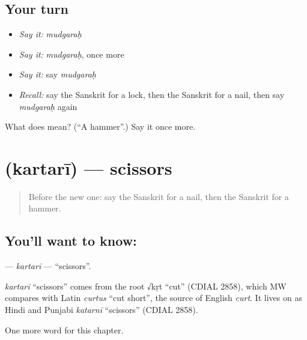 \subsection*{Your turn}
\begin{itemize}
\raggedright
  \item \emph{Say it:} \emph{mudgaraḥ}
  \item \emph{Say it:} \emph{mudgaraḥ}, once more
  \item \emph{Say it:} say \emph{mudgaraḥ}
  \item \emph{Recall:} say the Sanskrit for a lock, then the Sanskrit for a nail, then say \emph{mudgaraḥ} again
\end{itemize}

\begin{tcolorbox}[breakable,colback=teal!4,colframe=teal!35!black,title={Before you move on}]
What does  mean? (\textquotedblleft{}A hammer\textquotedblright{}.) Say it once more.
\end{tcolorbox}
\section[\texorpdfstring{\sk{कर्तरी} (kartarī)}{कर्तरी (kartarī)}]{ (kartarī) — scissors}

\label{lesson:SA-C100-kartari}



\begin{quote}
Before the new one: say the Sanskrit for a nail, then the Sanskrit for a hammer.
\end{quote}

\subsection*{You'll want to know: }
\textbf{} — \emph{kartarī} — \textquotedblleft{}scissors\textquotedblright{}.

\begin{cousinweb}
\emph{kartarī} \textquotedblleft{}scissors\textquotedblright{} comes from the root √kṛt \textquotedblleft{}cut\textquotedblright{} (CDIAL 2858), which MW compares with Latin \emph{curtus} \textquotedblleft{}cut short\textquotedblright{}, the source of English \emph{curt}. It lives on as Hindi and Punjabi \emph{katarnī} \textquotedblleft{}scissors\textquotedblright{} (CDIAL 2858).
\end{cousinweb}

\begin{grammarlens}[title={What you've built}]
One more word for this chapter.
\end{grammarlens}

